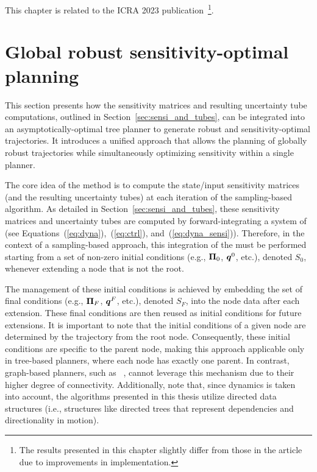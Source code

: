 This chapter is related to the ICRA 2023 publication~\cite{cSAMP}\footnote{The results presented in this chapter slightly differ from those in the article due to improvements in implementation.}.

\section{Global robust sensitivity-optimal planning}\label{sec:samp}

This section presents how the sensitivity matrices and resulting uncertainty tube computations, outlined in Section~\ref{sec:sensi_and_tubes}, can be integrated into an asymptotically-optimal tree planner to generate robust and sensitivity-optimal trajectories. 
It introduces a unified approach that allows the planning of globally robust trajectories while simultaneously optimizing sensitivity within a single planner.

The core idea of the method is to compute the state/input sensitivity matrices (and the resulting uncertainty tubes) at each iteration of the sampling-based algorithm. 
As detailed in Section~\ref{sec:sensi_and_tubes}, these sensitivity matrices and uncertainty tubes are computed by forward-integrating a system of  (see Equations~(\ref{eq:dyna}),~(\ref{eq:ctrl}), and~(\ref{eq:dyna_sensi})). 
Therefore, in the context of a sampling-based approach, this integration of the  must be performed starting from a set of non-zero initial conditions (e.g., $\boldsymbol{\Pi}_0$, $\boldsymbol{q}^0$, etc.), denoted $S_0$, whenever extending a node that is not the root.

The management of these initial conditions is achieved by embedding the set of final conditions (e.g., $\boldsymbol{\Pi}_F$, $\boldsymbol{q}^F$, etc.), denoted $S_F$, into the node data after each extension. 
These final conditions are then reused as initial conditions for future extensions. 
It is important to note that the initial conditions of a given node are determined by the trajectory from the root node. 
Consequently, these initial conditions are specific to the parent node, making this approach applicable only in tree-based planners, where each node has exactly one parent. 
In contrast, graph-based planners, such as ~\cite{cPRM}, cannot leverage this mechanism due to their higher degree of connectivity.
Additionally, note that, since dynamics is taken into account, the algorithms presented in this thesis utilize directed data structures (i.e., structures like directed trees that represent dependencies and directionality in motion).

